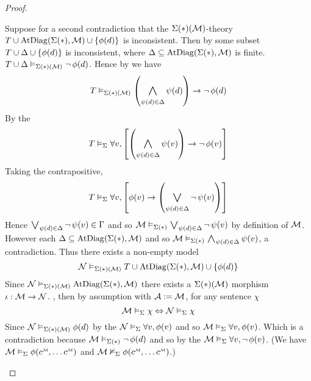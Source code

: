\begin{proof}
\begin{backward}
        Suppose for a second contradiction that the $\Sigma(*)(\mathcal{M})$-theory
        $T \cup \mathrm{AtDiag}(\Sigma(*),\mathcal{M}) \cup \left\{\phi(d)\right\}$ is inconsistent.
        Then by  
        some subset
        $T \cup \Delta \cup \left\{\phi(d)\right\}$ is inconsistent, 
        where $\Delta \subseteq \mathrm{AtDiag}(\Sigma(*),\mathcal{M})$ is finite.
            $T \cup \Delta \vDash_{\Sigma(*)(\mathcal{M})} \neg\, \phi(d)$.
        Hence by  we have 
        \[T \model{\Si(*)(\MM)} 
            \brkt{\bigand{\psi(d) \in \De}{} \psi(d)} \to \NOT \phi(d)\]
        By the 
        \[T \model{\Si} 
            \forall v, 
            \sqbrkt{\brkt{\bigand{\psi(d) \in \De}{}\psi(v)} 
            \to \NOT \phi(v)}\]
        Taking the contrapositive, 
        \[T \model{\Si} 
            \forall v, 
            \sqbrkt{\phi(v) 
            \to \brkt{\bigor{\psi(d) \in \De}{}\NOT \psi(v)}}\]
        Hence $\bigor{\psi(d) \in \De}{}\NOT \psi(v) \in \Ga$
        and so $\MM \model{\Si(*)} \bigor{\psi(d) \in \De}{}\NOT \psi(v)$
        by definition of $\mathcal{M}$.
        However each $\Delta \subseteq \mathrm{AtDiag}(\Sigma(*),\mathcal{M})$ and so
        $\MM \model{\Si(*)} \bigand{\psi(d) \in \De}{}\psi(v)$, 
        a contradiction.
        Thus there exists a non-empty model
        \[\mathcal{N} \vDash_{\Sigma(*)(\mathcal{M})} T \cup 
            \mathrm{AtDiag}(\Sigma(*),\mathcal{M}) \cup \left\{\phi(d)\right\}\]
        Since $\mathcal{N} \vDash_{\Sigma(*)(\mathcal{M})} \mathrm{AtDiag}(\Sigma(*),\mathcal{M})$ there exists a 
        $\Sigma(*)(\mathcal{M})$ morphism $\iota : \mathcal{M} \to \mathcal{N}$.
        , then
        by assumption with $\mathcal{A} := \mathcal{M}$, for any sentence $\chi$
        \[\mathcal{M} \vDash_{\Sigma} \chi
            \Leftrightarrow \mathcal{N} \vDash_{\Sigma} \chi\]
        Since $\mathcal{N} \vDash_{\Sigma(*)(\mathcal{M})} \phi(d)$ by the 
        $\mathcal{N} \vDash_{\Sigma} \forall v, \phi(v)$
        and so $\mathcal{M} \vDash_{\Sigma} \forall v, \phi(v)$.
        Which is a contradiction because
        $\mathcal{M} \vDash_{\Sigma(*)} \neg\, \phi(d)$ and so 
        by the  
        $\mathcal{M} \vDash_{\Sigma} \forall v, \neg\, \phi(v)$.
        (We have
        $\MM \model{\Si} \phi(\modintp{\MM}{c}, \dots \modintp{\MM}{c})$
        and $\MM \nodel{\Si} \phi(\modintp{\MM}{c}, \dots \modintp{\MM}{c})$.)
    \end{backward}
\end{proof}

